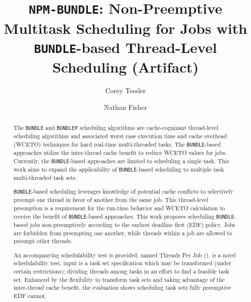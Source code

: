 \documentclass[a4paper,USenglish,english]{darts-v2018}
\title{\texttt{NPM-BUNDLE}: Non-Preemptive Multitask Scheduling for
  Jobs with \texttt{BUNDLE}-based Thread-Level Scheduling (Artifact)}
\author{Corey Tessler}{
  Wayne State University,
  {Detroit, Michigan, United States}
}{corey.tessler@wayne.edu}{}{}
\author{Nathan Fisher}{
  Wayne State Univeristy, {Detroit, Michigan, United States}
}{fishern@wayne.edu}{}{}
\begin{document}
\newcommand{\bundlep}{\texttt{BUNDLEP}}
\newcommand{\bundle}{\texttt{BUNDLE}}
\newcommand{\npmbundle}{\texttt{NPM-BUNDLE}}
\newcommand{\tpj}{\text{\sc{tpj}}}

\maketitle

\begin{abstract}
  The \bundle{} and \bundlep{} scheduling algorithms are cache-cognizant
  thread-level scheduling algorithms and associated worst case
  execution time and cache overhead (WCETO) techniques for hard
  real-time multi-threaded tasks. The \texttt{BUNDLE}-based approaches
  utilize the inter-thread cache benefit to reduce WCETO values for 
  jobs. Currently, the \texttt{BUNDLE}-based approaches are limited to
  scheduling a single task. This work aims to expand the applicability
  of \texttt{BUNDLE}-based scheduling to multiple task multi-threaded
  task sets.

  \texttt{BUNDLE}-based scheduling leverages knowledge of potential
  cache conflicts to selectively preempt one thread in favor of
  another from the same job. This thread-level preemption is a
  requirement for the run-time behavior and WCETO calculation to
  receive the benefit of \texttt{BUNDLE}-based approaches. This work
  proposes scheduling \texttt{BUNDLE}-based jobs non-preemptively
  according to the earliest deadline first (EDF) policy. Jobs are
  forbidden from preempting one another, while threads within a job
  are allowed to preempt other threads.

  An accompanying schedulability test is provided, named Threads Per
  Job (\tpj{}). \tpj{} is a novel schedulability test, input is a task
  set specification which may be transformed (under certain
  restrictions); dividing threads among tasks in an effort to find
  a feasible task set. Enhanced by the flexibility to transform task
  sets and taking advantage of the inter-thread cache benefit, the
  evaluation shows \tpj{} scheduling task sets fully preemptive EDF
  cannot. 
\end{abstract}

\end{document}
